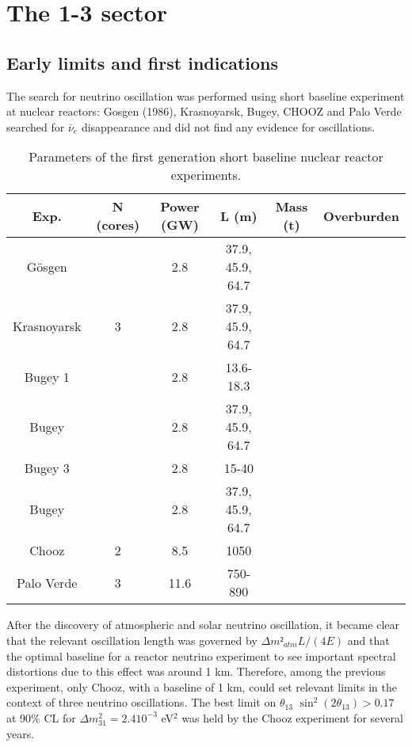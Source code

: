 \section{The 1-3 sector}

\subsection{Early limits and first indications}

The search for neutrino oscillation was performed using short baseline experiment at nuclear reactors: Gosgen (1986), Krasnoyarsk, Bugey, CHOOZ and Palo Verde searched for $\bar{\nu}_e$ disappearance and did not find any evidence for oscillations.

\begin{table}
\centering
\begin{tabular}{|c|c|c|c|c|c|}
  \hline
  Exp. & N (cores) & Power (GW) & L (m) & Mass (t) & Overburden \\ 
  \hline
  Gösgen & & 2.8 & 37.9, 45.9, 64.7 & & \\
  Krasnoyarsk & 3 & 2.8 & 37.9, 45.9, 64.7 & & \\
  Bugey 1 & & 2.8 & 13.6-18.3 & & \\
    Bugey & & 2.8 & 37.9, 45.9, 64.7 & & \\
      Bugey 3 & & 2.8 & 15-40 & & \\
        Bugey & & 2.8 & 37.9, 45.9, 64.7 & & \\
  Chooz & 2 & 8.5 & 1050  & & \\
  Palo Verde & 3 & 11.6 & 750-890 & & \\
  \hline
\end{tabular}
\caption{Parameters of the first generation short baseline nuclear reactor experiments.
}
\end{table}


After the discovery of atmospheric and solar neutrino oscillation, it became clear that the relevant oscillation length was governed by $\Delta m²_{atm} L/(4E)$ and that the  optimal baseline for a reactor neutrino experiment to see important spectral distortions due to this effect was around 1 km.  Therefore, among the previous experiment, only Chooz, with a baseline of 1 km, could set relevant limits in the context of three neutrino oscillations. The best limit on $\theta_{13}$ $\sin^2 (2 \theta_{13})>0.17 $ at 90\% CL for $\Delta m^2_{31}=2.4 10^{-3}$ eV$^2$ was held by the Chooz experiment\cite{apollonio2003} for several years. 

